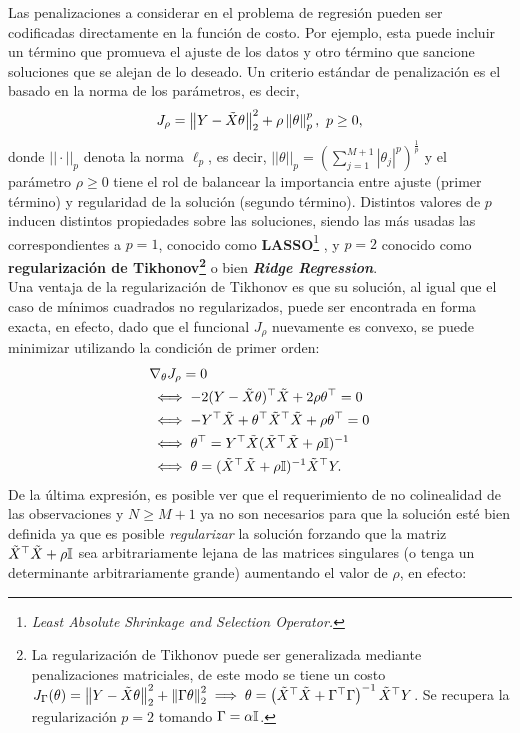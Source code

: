 Las penalizaciones a considerar en el problema de regresión pueden ser codificadas directamente en la función de costo. Por ejemplo, esta puede incluir un término que promueva el ajuste de los datos y otro término que sancione soluciones que se alejan de lo deseado. Un criterio estándar de penalización es el basado en la norma de los parámetros, es decir, 
\begin{equation}
	J_\rho = \left\lVert Y-\tilde{X}\theta\right\rVert_2^2 + \rho\left\lVert\theta\right\rVert_p^p,\ p\geq 0,
	\label{eq:reg_least_squares}
\end{equation} 
donde $||\cdot||_p$ denota la norma $\ell_p$, es decir, $||\theta||_p=\left(\sum\limits_{j=1}^{M+1}|\theta_j|^p\right)^\frac{1}{p}$ y el parámetro $\rho\geq0$ tiene el rol de balancear la importancia entre ajuste (primer término) y regularidad de la solución (segundo término). Distintos valores de $p$ inducen distintos propiedades sobre las soluciones, siendo las más usadas las correspondientes a $p=1$, conocido como \textbf{LASSO}\footnote{\emph{Least Absolute Shrinkage and Selection Operator.}} \cite{tibshirani_1996}, y $p=2$ conocido como \textbf{regularización de Tikhonov\footnote{La regularización de Tikhonov puede ser generalizada mediante penalizaciones matriciales, de este modo se tiene un costo $J_\Gamma(\theta)=\left\lVert Y-\tilde{X}\theta\right\rVert_2^2 + \left\lVert\Gamma\theta\right\rVert_2^2  \implies \theta = \left(\tilde{X}^\top\tilde{X} +\Gamma^\top\Gamma\right)^{-1} \tilde{X}^\top Y$. Se recupera la regularización $p=2$ tomando $\Gamma = \alpha{\mathbb I}$.}} \cite{tikhonov_arsenin_1977} o bien \textbf{\emph{Ridge Regression}}.\\  

Una ventaja de la regularización de Tikhonov es que su solución, al igual que el caso de mínimos cuadrados no regularizados, puede ser encontrada en forma exacta, en efecto, dado que el funcional $J_\rho$ nuevamente es convexo, se puede minimizar utilizando la condición de primer orden:
\begin{align}
	&\nabla_\theta J_\rho = 0\nonumber\\
	&\iff -2(Y-\tilde{X}\theta)^\top\tilde{X} + 2\rho\theta^\top =0\nonumber\\
	&\iff -Y^\top\tilde{X} +\theta^\top\tilde{X}^\top\tilde{X} + \rho\theta^\top= 0\nonumber\\
	&\iff \theta^\top = Y^\top \tilde{X}(\tilde{X}^\top\tilde{X} + \rho{\mathbb I})^{-1}\nonumber\\
	&\iff \theta = (\tilde{X}^\top\tilde{X}+\rho{\mathbb I})^{-1}\tilde{X}^\top Y.
\end{align}
De la última expresión, es posible ver que el requerimiento de no colinealidad de las observaciones y $N\geq M+1$ ya no son necesarios para que la solución esté bien definida ya que es posible \emph{regularizar} la solución forzando que la matriz $\tilde{X}^\top\tilde{X} +\rho {\mathbb I}$ sea arbitrariamente lejana de las matrices singulares (o tenga un determinante arbitrariamente grande) aumentando el valor de $\rho$, en efecto:

